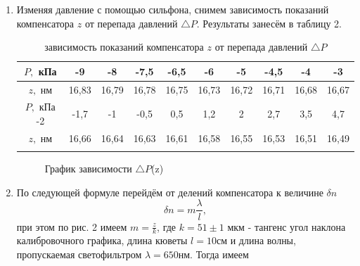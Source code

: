 \documentclass[a4paper, 12pt]{article}%
\begin{document}
\begin{enumerate}
		
		\item Изменяя давление с помощью сильфона, снимем зависимость показаний компенсатора $z$ от перепада давлений $\triangle P$. Результаты занесём в таблицу 2.
		
		\begin{longtable}{|c|c|c|c|c|c|c|c|c|c|}
			\hline
			$P, $ кПа & -9 & -8 & -7,5 & -6,5 & -6 & -5& -4,5 & -4 & -3\\
			\hline
			$z,$ нм& 16,83 & 16,79 & 16,78 & 16,75 & 16,73 & 16,72 & 16,71 & 16,68 & 16,67  \\
			
			\hline
			\hline
			
			$P, $ кПа  -2 & -1,7 & -1 & -0,5 & 0,5 & 1,2 & 2 & 2,7 & 3,5 & 4,7  \\
			\hline
			$z,$ нм&  16,66 & 16,64 & 16,63 & 16,61 & 16,58 & 16,55 & 16,53 & 16,51 & 16,49  \\ \hline
			
			\caption{зависимость показаний компенсатора $z$ от перепада давлений $\triangle P$ }
		\end{longtable}
		
		
		\begin{figure}[H]
			\caption{График зависимости $\triangle P$(z)}
		\end{figure}
		
		
		\item По следующей формуле перейдём от делений компенсатора к величине $\delta n$
		\begin{equation}
			\delta n = m\frac{\lambda}{l},
		\end{equation}
		при этом по рис. 2 имеем $ m = \frac{z}{k}$, где $k = 51 \pm 1$ мкм - тангенс угол наклона калибровочного графика, длина кюветы $l = 10 $см и длина волны, пропускаемая светофильтром $\lambda = 650 $нм. Тогда имеем
		

\end{enumerate}
\end{document}
